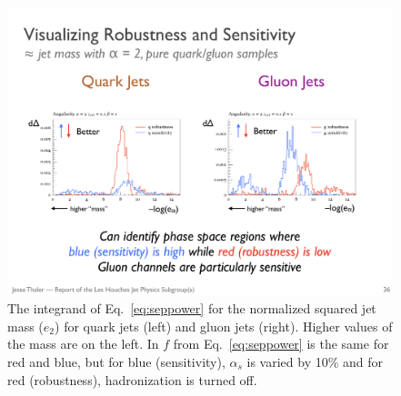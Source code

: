 \begin{figure}[h!]
\begin{center}
\includegraphics[width = 0.99\columnwidth]{figures/differentialseparation.pdf}
\end{center}
\caption{The integrand of Eq.~\ref{eq:seppower} for the normalized
  squared jet mass ($e_2$) for quark jets (left) and gluon jets
  (right).  Higher values of the mass are on the left.  In $f$ from
  Eq.~\ref{eq:seppower} is the same for red and blue, but for blue
  (sensitivity), $\alpha_s$ is varied by 10\% and for red
  (robustness), hadronization is turned off. }
\label{fig:differentialseparation}
\end{figure}

